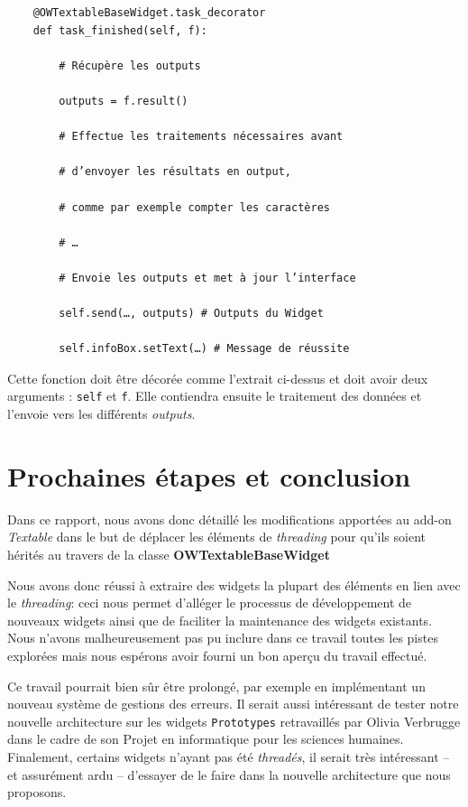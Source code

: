 \documentclass{article}
\begin{document}
\begin{verbatim}
    @OWTextableBaseWidget.task_decorator
    def task_finished(self, f):
    
        # Récupère les outputs
        
        outputs = f.result()
        
        # Effectue les traitements nécessaires avant
        
        # d’envoyer les résultats en output,
        
        # comme par exemple compter les caractères
        
        # …
        
        # Envoie les outputs et met à jour l’interface
        
        self.send(…, outputs) # Outputs du Widget
        
        self.infoBox.setText(…) # Message de réussite
\end{verbatim}

Cette fonction doit être décorée comme l'extrait ci-dessus et doit avoir deux arguments : \texttt{self} et \texttt{f}. Elle contiendra ensuite le traitement des données et l'envoie vers les différents \textit{outputs}.

\section{Prochaines étapes et conclusion}

Dans ce rapport, nous avons donc détaillé les modifications apportées au add-on \textit{Textable} dans le but de déplacer les éléments de \textit{threading} pour qu'ils soient hérités au travers de la classe \textbf{OWTextableBaseWidget}

Nous avons donc réussi à extraire des widgets la plupart des éléments en lien avec le \textit{threading}: ceci nous permet d'alléger le processus de développement de nouveaux widgets ainsi que de faciliter la maintenance des widgets existants. Nous n'avons malheureusement pas pu inclure dans ce travail toutes les pistes explorées mais nous espérons avoir fourni un bon aperçu du travail effectué.

Ce travail pourrait bien sûr être prolongé, par exemple en implémentant un nouveau système de gestions des erreurs. Il serait aussi intéressant de tester notre nouvelle architecture sur les widgets \texttt{Prototypes} retravaillés par Olivia Verbrugge dans le cadre de son Projet en informatique pour les sciences humaines. Finalement, certains widgets n'ayant pas été \textit{threadés}, il serait très intéressant – et assurément ardu – d'essayer de le faire dans la nouvelle architecture que nous proposons.
\end{document}
